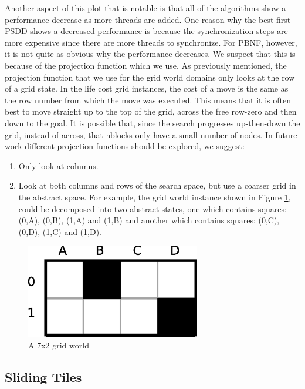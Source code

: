 \documentclass{article}
\begin{document}
Another aspect of this plot that is notable is that all of the
algorithms show a performance decrease as more threads are added.  One
reason why the best-first PSDD shows a decreased performance is
because the synchronization steps are more expensive since there are
more threads to synchronize.  For PBNF, however, it is not quite as
obvious why the performance decreases.  We suspect that this is
because of the projection function which we use.  As previously
mentioned, the projection function that we use for the grid world
domains only looks at the row of a grid state.  In the life cost grid
instances, the cost of a move is the same as the row number from which
the move was executed.  This means that it is often best to move
straight up to the top of the grid, across the free row-zero and then
down to the goal.  It is possible that, since the search progresses
up-then-down the grid, instead of across, that nblocks only have a
small number of nodes.  In future work different projection functions
should be explored, we suggest:
\begin{enumerate}
\item Only look at columns.
\item Look at both columns and rows of the search space, but use a
  coarser grid in the abstract space.  For example, the grid world
  instance shown in Figure \ref{fig:small-grid}, could be decomposed
  into two abstract states, one which contains squares: (0,A), (0,B),
  (1,A) and (1,B) and another which contains squares: (0,C), (0,D),
  (1,C) and (1,D).
\end{enumerate}

\begin{figure}[t]
\begin{center}
\includegraphics[width=3in]{images/grid-world-small.eps}
\caption{A 7x2 grid world}
\label{fig:small-grid}
\end{center}
\end{figure}

\subsection{Sliding Tiles}
\end{document}
